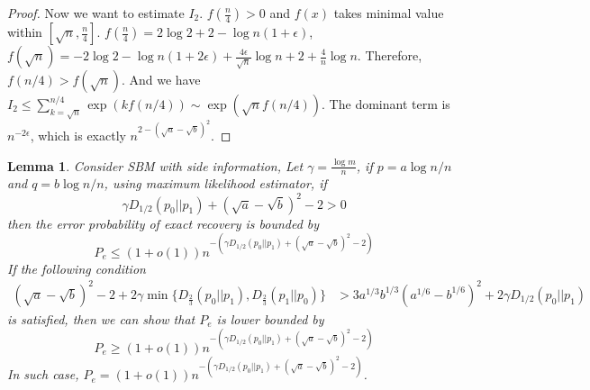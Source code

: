 \documentclass{article}
\newtheorem{lemma}{Lemma}
\begin{document}
\begin{proof}
	Now we want to estimate $I_2$. $f(\frac{n}{4}) > 0$ and $f(x)$ takes minimal value within $[\sqrt{n}, \frac{n}{4}]$.
	$f(\frac{n}{4}) = 2\log 2 + 2 - \log n (1+\epsilon)$, $f(\sqrt{n}) = -2\log 2 - \log n(1+2\epsilon) + \frac{4\epsilon}{\sqrt{n}}\log n + 2 + \frac{4}{n}\log n $.
	Therefore, $f(n/4) > f(\sqrt{n})$. And we have $I_2 \leq \sum_{k=\sqrt{n}}^{n/4} \exp(kf(n/4)) \sim \exp(\sqrt{n}f(n/4))$.
	The dominant term is $n^{-2\epsilon}$, which is exactly $n^{2-(\sqrt{a} - \sqrt{b})^2}$.
	

\end{proof}
\begin{lemma}
	Consider SBM with side information, 
	Let $\gamma = \frac{\log m}{n}$, if $p = a \log n /n$ and $q = b \log n / n$, using maximum likelihood estimator,
	if
	\begin{equation}\label{eq:positive_condition}
	\gamma D_{1/2}(p_0||p_1) + (\sqrt{a} - \sqrt{b})^2-2 > 0
	\end{equation}
	then the error probability
	of exact recovery is bounded by
	\begin{equation}\label{eq:PeMain}
	P_e \leq (1+o(1)) n^{-\left(\gamma D_{1/2}(p_0||p_1) + (\sqrt{a} - \sqrt{b})^2-2\right)}
	\end{equation}
	If the following condition
	\begin{align}
	(\sqrt{a}-\sqrt{b})^2-2 + 2\gamma \min \{D_{\frac{2}{3}}(p_0||p_1), D_{\frac{2}{3}}(p_1||p_0) \} & > 3a^{1/3}b^{1/3}(a^{1/6}-b^{1/6})^2 + 2\gamma D_{1/2}(p_0||p_1)\label{eq:oneC}
	\end{align}
	is satisfied, then we can show that $P_e$ is lower bounded by
	\begin{equation}\label{eq:PeMainL}
	P_e \geq (1+o(1)) n^{-\left(\gamma D_{1/2}(p_0||p_1) + (\sqrt{a} - \sqrt{b})^2-2\right)}
	\end{equation}
	In such case, $P_e=(1+o(1)) n^{-\left(\gamma D_{1/2}(p_0||p_1) + (\sqrt{a} - \sqrt{b})^2-2\right)}$.
\end{lemma}
\end{document}
